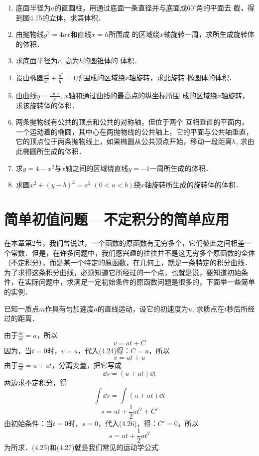\begin{ex}
\begin{enumerate}
    \item 底面半径为$a$的直圆柱，用通过底面一条直径并与底面成$60^{\circ}$角的平面去
    截，得到图4.15的立体，求其体积．
    \item 由抛物线$y^2=4ax$和直线$x=h$所围成
    的区域绕$x$轴旋转一周，求所生成旋转体的体积．
    \item 求底面半径为$r$, 高为$h$的圆锥体的
    体积．
    \item 设由椭圆$\frac{x^2}{a^2}+\frac{y^2}{b^2}=1$所围成的区域绕$x$轴旋转，求此旋转
    椭圆体的体积．
    \item 由曲线$y=\frac{\ln x}{x}$, $x$轴和通过曲线的最高点的纵坐标所围
    成的区域绕$x$轴旋转，求该旋转体的体积．
    \item 两条抛物线有公共的顶点和公共的对称轴，但位于两个
    互相垂直的平面内，一个运动着的椭圆，其中心在两抛物线的公共轴上，它的平面与公共轴垂直，它的顶点位于两条抛物线上，如果椭圆从公共顶点开始，移动一段距离$h$, 求由此椭圆所生成的体积．
    \item 求$y=4-x^2$与$x$轴之间的区域绕直线$y=-1$一周所生成的体积．
    \item 求圆$x^2+(y-b)^2=a^2\; (0<a<b)$绕$x$轴旋转所生成的旋转体的体积．
\end{enumerate}
\end{ex}

\section{简单初值问题{}---{}不定积分的简单应用}

在本章第2节，我们曾说过，一个函数的原函数有无穷多个，它们彼此之间相差一个常数．但是，在许多问题中，我们感兴趣的往往并不是这无穷多个原函数的全体（不定积分），而是某一个特定的原函数，在几何上，就是一条特定的积分曲线．为了求得这条积分曲线，必须知道它所经过的一个点，也就是说，要知道初始条件，在实际问题中，求满足一定初始条件的原函数问题是很多的，下面举一些简单的实例．

\begin{example}
    已知一质点$m$作具有匀加速度$a$的直线运动，设它的初速度为$u$, 求质点在$t$秒后所经过的距离．
\end{example}

\begin{solution}
由于$\frac{\dd v}{\dd t}=a$，所以
\begin{equation}
    v=at+C
\end{equation}
因为，当$t=0$时，$v=u$，代入(4.24)得：$C=u$，所以
\begin{equation}
    v=at+u
\end{equation}
由于$\frac{\dd s}{\dd t}=u+at$，分离变量，把它写成
\[\dd s=(u+at)\dd t\]
两边求不定积分，得
\[\int \dd s=\int (u+at)\dd t\]
\begin{equation}
    s=ut+\frac{1}{2}at^2+C'
\end{equation}
由初始条件：当$t=0$时，$s=0$，代入(4.26)，得：$C'=0$，所以
\begin{equation}
    s=ut+\frac{1}{2}at^2
\end{equation}
为所求．(4.25)和(4.27)就是我们常见的运动学公式.
\end{solution}


